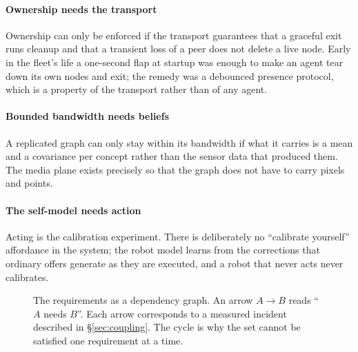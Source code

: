 \documentclass[10pt,twocolumn]{IEEEtran}
\begin{document}
\paragraph{Ownership needs the transport} Ownership can only be enforced if the transport guarantees
that a graceful exit runs cleanup and that a transient loss of a peer does not delete a live node.
Early in the fleet's life a one-second flap at startup was enough to make an agent tear down its own
nodes and exit; the remedy was a debounced presence protocol, which is a property of the transport
rather than of any agent.

\paragraph{Bounded bandwidth needs beliefs} A replicated graph can only stay within its bandwidth if
what it carries is a mean and a covariance per concept rather than the sensor data that produced
them. The media plane exists precisely so that the graph does not have to carry pixels and points.

\paragraph{The self-model needs action} Acting is the calibration experiment. There is deliberately
no ``calibrate yourself'' affordance in the system; the robot model learns from the corrections that
ordinary offers generate as they are executed, and a robot that never acts never calibrates.

\begin{figure}[t]
\centering
{}
\caption{The requirements as a dependency graph. An arrow $A\to B$ reads ``$A$ needs $B$''. Each
arrow corresponds to a measured incident described in \S\ref{sec:coupling}. The cycle is why the set
cannot be satisfied one requirement at a time.}
\label{fig:coupling}
\end{figure}
\end{document}
